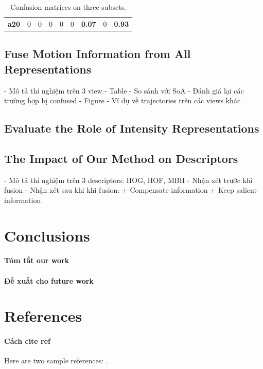 \documentclass[review]{elsarticle}
\begin{document}
\begin{table}[H]
\begin{center}
{\begin{tabular}{c|cccccccc}
			     {\bf a20} &              0 &              0 &              0 &              0 &              0 &    {\bf 0.07 } &              0 &    {\bf 0.93 } \\
			
			\end{tabular}
		}
		
				
		\subfloat{
		
		}
	\end{center}
	\caption{\label{lbl:AS123ConfusionMatrix}Confusion matrices on three subsets.}
\end{table}


\subsection{Fuse Motion Information from All Representations}
 
 
 
- Mô tả thí nghiệm trên 3 view
- Table - So sánh với SoA
- Đánh giá lại các trường hợp bị confused
- Figure - Ví dụ về trajectories trên các views khác

\subsection{Evaluate the Role of Intensity Representations}


\subsection{The Impact of Our Method on Descriptors}

- Mô tả thí nghiệm trên 3 descriptors: HOG, HOF, MBH
- Nhận xét trước khi fusion
- Nhận xét sau khi khi fusion:
    + Compensate information
    + Keep salient information

\section{Conclusions}

\paragraph{Tóm tắt our work}

\paragraph{Đề xuất cho future work}



\section*{References}

\paragraph{Cách cite ref}Here are two sample references: \cite{Feynman1963118,Dirac1953888}.


\end{document}

